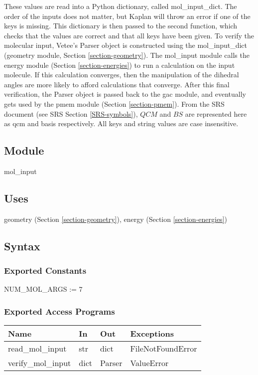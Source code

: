 \documentclass[12pt, titlepage]{article}
\newcommand{\progname}{Kaplan}
\begin{document}
These values are read into a Python dictionary, called mol\_input\_dict. The 
order of the inputs does not matter, but \progname{} will throw an error if one 
of the keys is missing. This dictionary is then passed to the second function, 
which checks that the values are correct and that all keys have been given. To 
verify the molecular input, Vetee's Parser object is constructed using the 
mol\_input\_dict (geometry module, Section \ref{section-geometry}). The 
mol\_input module calls the energy module (Section \ref{section-energies}) to 
run a calculation on the input molecule. If this calculation converges, then 
the manipulation of the dihedral angles are more likely to afford calculations 
that converge. After this final verification, the Parser object is passed back 
to the gac module, and eventually gets used by the pmem module 
(Section \ref{section-pmem}). From the SRS document (see SRS Section 
\ref{SRS-symbols}), $QCM$ and $BS$ are represented here as qcm and basis 
respectively. All keys and string values are case insensitive.

\subsection{Module}

mol\_input

\subsection{Uses}

geometry (Section \ref{section-geometry}), energy (Section 
\ref{section-energies})

\subsection{Syntax}

\subsubsection{Exported Constants}

NUM\_MOL\_ARGS := 7

\subsubsection{Exported Access Programs}

\begin{table}[H]
	\begin{tabular}{p{4cm} p{2cm} p{2cm} p{5cm}}
		\toprule
		\textbf{Name} & \textbf{In} & \textbf{Out} & \textbf{Exceptions} \\
		\hline
		read\_mol\_input   & str  & dict & FileNotFoundError \\
		verify\_mol\_input & dict & Parser & ValueError \\
		\bottomrule
	\end{tabular}
\end{table}
\end{document}
